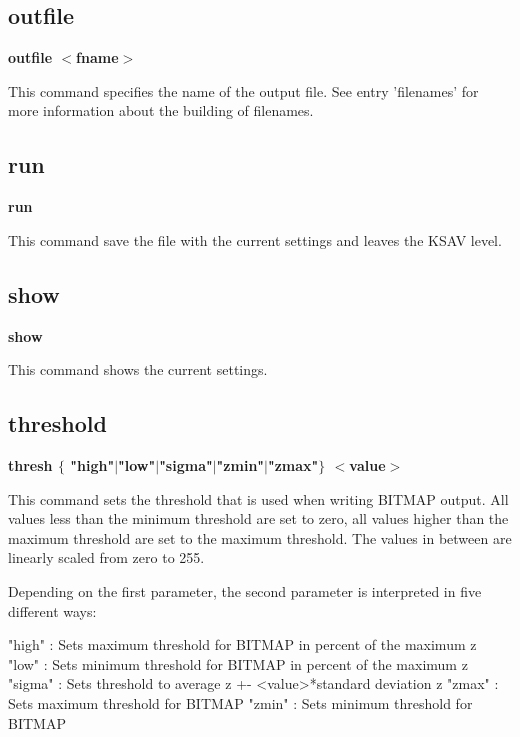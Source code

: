 \subsection*{outfile}
{\bf outfile $ <$fname$> $ \par }
\par
\vspace{3pt}
This command specifies the name of the output file. See entry 'filenames' 
for more information about the building of filenames. 
\subsection*{run}
{\bf run \par }
\par
\vspace{3pt}
This command save the file with the current settings and leaves the 
KSAV level. 
\subsection*{show}
{\bf show \par }
\par
\vspace{3pt}
This command shows the current settings. 
\subsection*{threshold}
{\bf thresh $ \{$ "high"$| $"low"$| $"sigma"$| $"zmin"$| $"zmax"$\} $ $ <$value$> $ \par }
\par
\vspace{3pt}
This command sets the threshold that is used when writing BITMAP output. 
All values less than the minimum threshold are set to zero, 
all values higher than the maximum threshold are set to the 
maximum threshold. The values in between are linearly scaled from zero 
to 255. 
\par
Depending on the first parameter, the second parameter is interpreted in 
five different ways: 
\par
\begin{MacVerbatim}
"high"  : Sets maximum threshold for BITMAP in percent of the maximum z
"low"   : Sets minimum threshold for BITMAP in percent of the maximum z
"sigma" : Sets threshold to average z +- <value>*standard deviation z
"zmax"  : Sets maximum threshold for BITMAP
"zmin"  : Sets minimum threshold for BITMAP
\end{MacVerbatim}

